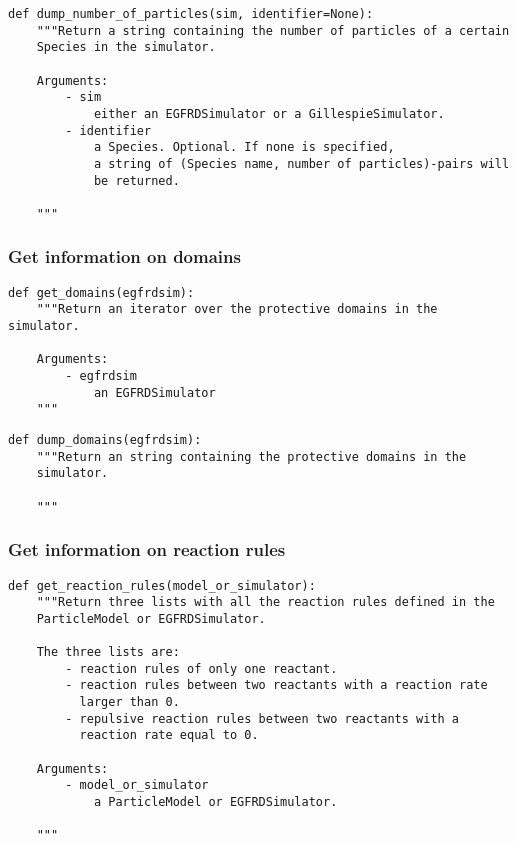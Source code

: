 \documentclass[a4paper,10pt]{article}
\begin{document}
\begin{verbatim}
def dump_number_of_particles(sim, identifier=None):
    """Return a string containing the number of particles of a certain 
    Species in the simulator.

    Arguments:
        - sim
            either an EGFRDSimulator or a GillespieSimulator.
        - identifier
            a Species. Optional. If none is specified, 
            a string of (Species name, number of particles)-pairs will 
            be returned.

    """ 
\end{verbatim}

\subsubsection{Get information on domains}

\begin{verbatim}
def get_domains(egfrdsim):
    """Return an iterator over the protective domains in the simulator.

    Arguments:
        - egfrdsim
            an EGFRDSimulator
    """
\end{verbatim}

\begin{verbatim}
def dump_domains(egfrdsim):
    """Return an string containing the protective domains in the 
    simulator.

    """
\end{verbatim}

\subsubsection{Get information on reaction rules}

\begin{verbatim}
def get_reaction_rules(model_or_simulator):
    """Return three lists with all the reaction rules defined in the 
    ParticleModel or EGFRDSimulator.

    The three lists are:
        - reaction rules of only one reactant.
        - reaction rules between two reactants with a reaction rate 
          larger than 0.
        - repulsive reaction rules between two reactants with a 
          reaction rate equal to 0.

    Arguments:
        - model_or_simulator
            a ParticleModel or EGFRDSimulator.

    """
\end{verbatim}
\end{document}
